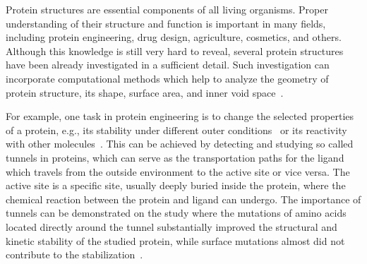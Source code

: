 \documentclass[usletter, 10pt, conference]{svjour3}      %
\begin{document}
Protein structures are essential components of all living organisms.
Proper understanding of their structure and function is important in many fields, including protein engineering, drug design, agriculture, cosmetics, and others.
Although this knowledge is still very hard to reveal, several protein structures have been already investigated in a sufficient detail. 
Such investigation can incorporate computational methods which help to analyze the geometry of protein structure, its shape, surface area, and inner void space~\cite{gora2013gates}.

For example, one task in protein engineering is to change the selected properties of a protein, e.g., its stability under different outer conditions~\cite{Koudelakova2013} or its reactivity with other molecules~\cite{Pavlova2009}.
This can be achieved by detecting and studying so called tunnels in proteins, which can serve as the transportation paths for the ligand which travels from the outside environment to the active site or vice versa. 
The active site is a specific site, usually deeply buried inside the protein, where the chemical reaction between the protein and ligand can undergo. 
The importance of tunnels can be demonstrated on the study where the mutations of amino acids located directly around the tunnel substantially improved the structural and kinetic stability of the studied protein, while surface mutations almost did not contribute to the stabilization~\cite{Koudelakova2013}.

\end{document}
